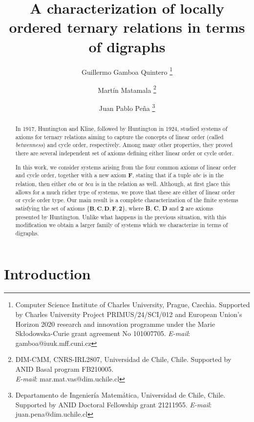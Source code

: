 \documentclass{article}
\title{A characterization of locally ordered ternary relations in terms of digraphs}
\author{
Guillermo Gamboa Quintero \thanks{Computer Science Institute of Charles University, Prague, Czechia. Supported by Charles University Project PRIMUS/24/SCI/012 and European Union’s Horizon 2020 research and innovation programme under the Marie Skłodowska-Curie grant agreement No 101007705. \textit{E-mail}: gamboa@iuuk.mff.cuni.cz} 
\and 
Mart\'{i}n Matamala \thanks{DIM-CMM, CNRS-IRL2807, Universidad de Chile, Chile. Supported by ANID  Basal program FB210005.  \\ \textit{E-mail}: mar.mat.vas@dim.uchile.cl} 
\and 
Juan Pablo Pe\~{n}a \thanks{Departamento de Ingenier\'{i}a Matem\'{a}tica, Universidad de Chile, Chile. Supported by ANID Doctoral Fellowship grant 21211955. \textit{E-mail}: juan.pena@dim.uchile.cl}}
\date{}
\begin{document}
\maketitle

\begin{abstract}
In 1917, Huntington and Kline, followed by Huntington in 1924, studied systems of axioms for ternary relations aiming to capture the concepts of linear order (called \emph{betwenness}) and cycle order, respectively. Among many other properties, they proved there are several independent set of axioms defining either linear order or cycle order. 



In this work, we consider systems arising from the four common axioms of linear order and cycle order, together with a new axiom \textbf{F}, stating that if a tuple $abc$ is in the relation, then either $cba$ or $bca$ is in the relation as well. Although, at first glace this allows for a much richer type of systems, we prove that these are either of linear order or cycle order type. Our main result is a complete characterization of the finite systems satisfying the set of axioms $\{ \textbf{B}, \textbf{C}, \textbf{D}, \textbf{F}, \textbf{2} \}$, where \textbf{B}, \textbf{C}, \textbf{D} and \textbf{2} are axioms presented by Huntington. Unlike what happens in the previous situation, with this modification we obtain a larger family of systems which we characterize in terms of digraphs.

\end{abstract}








\section{Introduction}
\end{document}
